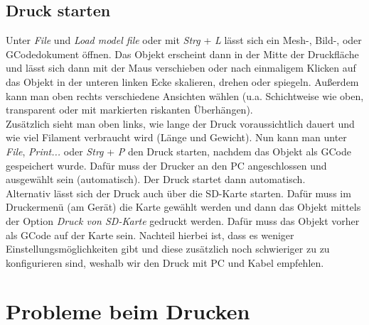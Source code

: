 \documentclass[11pt,a4paper]{scrartcl}
\begin{document}
\subsection*{Druck starten}
Unter \textit{File} und \textit{Load model file} oder mit \textit{Strg} + \textit{L} lässt sich ein Mesh-, Bild-, oder GCodedokument öffnen. Das Objekt erscheint dann in der Mitte der Druckfläche und lässt sich dann mit der Maus verschieben oder nach einmaligem Klicken auf das Objekt in der unteren linken Ecke skalieren, drehen oder spiegeln. Außerdem kann man oben rechts verschiedene Ansichten wählen (u.a. Schichtweise wie oben, transparent oder mit markierten riskanten Überhängen).\\
Zusätzlich sieht man oben links, wie lange der Druck voraussichtlich dauert und wie viel Filament verbraucht wird (Länge und Gewicht). Nun kann man unter \textit{File}, \textit{Print...} oder \textit{Strg} + \textit{P} den Druck starten, nachdem das Objekt als GCode gespeichert wurde. Dafür muss der Drucker an den PC angeschlossen und ausgewählt sein (automatisch). Der Druck startet dann automatisch.\\
Alternativ lässt sich der Druck auch über die SD-Karte starten. Dafür muss im Druckermenü (am Gerät) die Karte gewählt werden und dann das Objekt mittels der Option \textit{Druck von SD-Karte} gedruckt werden. Dafür muss das Objekt vorher als GCode auf der Karte sein. Nachteil hierbei ist, dass es weniger Einstellungsmöglichkeiten gibt und diese zusätzlich noch schwieriger zu zu konfigurieren sind, weshalb wir den Druck mit PC und Kabel empfehlen. 
\section{Probleme beim Drucken}

\end{document}
